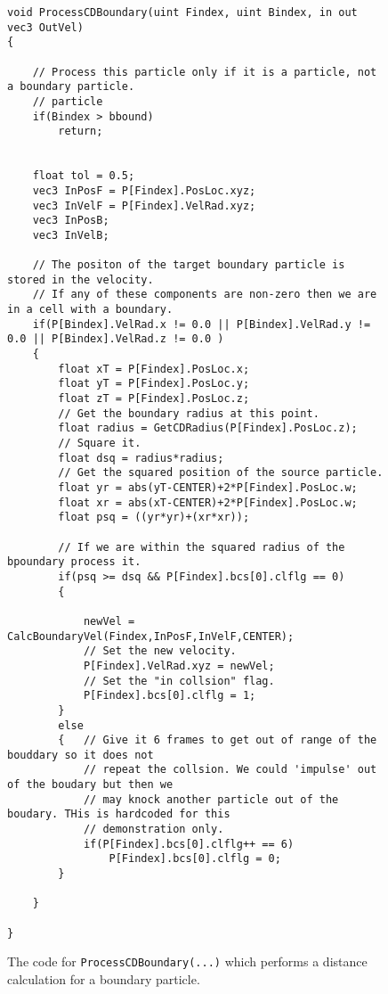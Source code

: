 
\begin{figure}[h]
\centering
\lstset{style=gpucode,linewidth=6.5in,xleftmargin=0.25in}

\begin{lstlisting}
void ProcessCDBoundary(uint Findex, uint Bindex, in out vec3 OutVel)
{

	// Process this particle only if it is a particle, not a boundary particle.
	// particle 
	if(Bindex > bbound)
		return;
		
		
	float tol = 0.5;
	vec3 InPosF = P[Findex].PosLoc.xyz;
	vec3 InVelF	= P[Findex].VelRad.xyz;
	vec3 InPosB;
	vec3 InVelB;
	
	// The positon of the target boundary particle is stored in the velocity.
	// If any of these components are non-zero then we are in a cell with a boundary.
	if(P[Bindex].VelRad.x != 0.0 || P[Bindex].VelRad.y != 0.0 || P[Bindex].VelRad.z != 0.0 ) 
	{
		float xT = P[Findex].PosLoc.x;
		float yT = P[Findex].PosLoc.y;
		float zT = P[Findex].PosLoc.z;
		// Get the boundary radius at this point.
		float radius = GetCDRadius(P[Findex].PosLoc.z);
		// Square it.
		float dsq = radius*radius;
	    // Get the squared position of the source particle.
		float yr = abs(yT-CENTER)+2*P[Findex].PosLoc.w;
		float xr = abs(xT-CENTER)+2*P[Findex].PosLoc.w;
		float psq = ((yr*yr)+(xr*xr));	
	
		// If we are within the squared radius of the bpoundary process it.
		if(psq >= dsq && P[Findex].bcs[0].clflg == 0)
		{
			
			newVel = CalcBoundaryVel(Findex,InPosF,InVelF,CENTER);
			// Set the new velocity.
			P[Findex].VelRad.xyz = newVel;
			// Set the "in collsion" flag.
			P[Findex].bcs[0].clflg = 1;
		}
		else
		{	// Give it 6 frames to get out of range of the bouddary so it does not
			// repeat the collsion. We could 'impulse' out of the boudary but then we 
			// may knock another particle out of the boudary. THis is hardcoded for this 
			// demonstration only.
			if(P[Findex].bcs[0].clflg++ == 6)
				P[Findex].bcs[0].clflg = 0;
		}

	}
	
}

\end{lstlisting}


\caption[Benchset test configuration file]{The code for \texttt{ProcessCDBoundary(...)} which performs a distance calculation for a boundary particle. }
\label{fig:ProcessCDNBoundary}
\end{figure}
